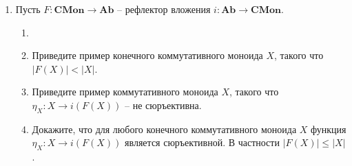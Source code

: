\documentclass[draft]{article}
\newcommand{\cat}[1]{\mathbf{#1}}
\newcommand{\CMon}{\cat{CMon}}
\newcommand{\Ab}{\cat{Ab}}
\begin{document}
\begin{enumerate}
\item Пусть $F : \CMon \to \Ab$ -- рефлектор вложения $i : \Ab \to \CMon$.
\begin{enumerate}
\item {}
\item Приведите пример конечного коммутативного моноида $X$, такого что $|F(X)| < |X|$.
\item Приведите пример коммутативного моноида $X$, такого что $\eta_X : X \to i(F(X))$ -- не сюръективна.
\item Докажите, что для любого конечного коммутативного моноида $X$ функция $\eta_X : X \to i(F(X))$ является сюръективной. В частности $|F(X)| \leq |X|$.
\end{enumerate}

\end{enumerate}
\end{document}
